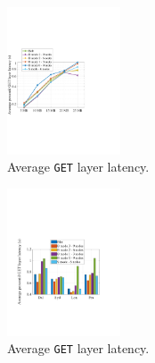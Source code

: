 %


\begin{figure}[t]
	\centering
	\includegraphics[width=0.3\textwidth]{graphs/dalprimaryperformance.pdf}
	\caption{Average \texttt{GET} layer latency.}
	\label{fig:eval-dalprimary}
	
\end{figure}

\begin{figure}[t]
	\centering
	\includegraphics[width=0.3\textwidth]{graphs/total-traces.pdf}
	\caption{Average \texttt{GET} layer latency.}
	\label{fig:eval-total-traces}
	
\end{figure}